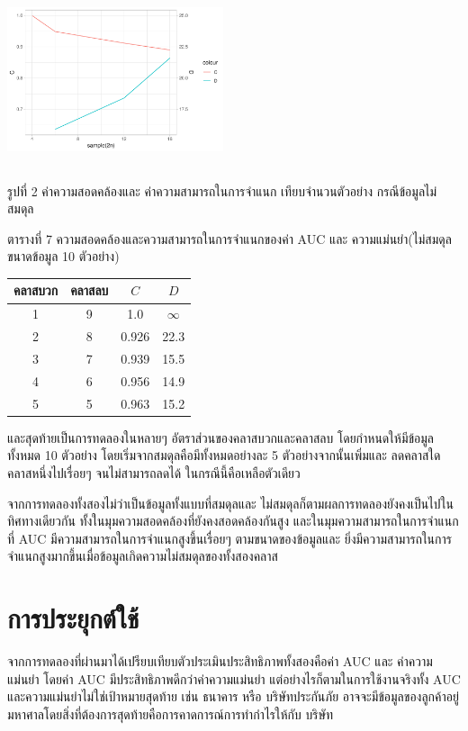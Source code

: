 \documentclass[twoside, twocolumn, 12pt]{article}
\begin{document}
\includegraphics[height=2in,width=2.5in]{pic/Rplot02.pdf}
\begin{center} รูปที่ 2 ค่าความสอดคล้องและ ค่าความสามารถในการจำแนก เทียบจำนวนตัวอย่าง กรณีข้อมูลไม่สมดุล\end{center}
ตารางที่ 7 ความสอดคล้องและความสามารถในการจำแนกของค่า AUC และ ความแม่นยำ(ไม่สมดุล ขนาดข้อมูล 10 ตัวอย่าง)
\begin{center}
\begin{tabular}{cccc}
\hline
คลาสบวก & คลาสลบ & $C$ & $D$\\
\hline
1&9&1.0 &$\infty$\\\hline
2&8&0.926&22.3\\\hline
3&7&0.939&15.5\\\hline
4&6&0.956&14.9\\\hline
5&5&0.963&15.2\\\hline
\end{tabular}
\end{center}

และสุดท้ายเป็นการทดลองในหลายๆ อัตราส่วนของคลาสบวกและคลาสลบ โดยกำหนดให้มีข้อมูลทั้งหมด 10 ตัวอย่าง โดยเริ่มจากสมดุลคือมีทั้งหมดอย่างละ 5 ตัวอย่างจากนั้นเพิ่มและ ลดคลาสใดคลาสหนึ่งไปเรื่อยๆ จนไม่สามารถลดได้ ในกรณีนี้คือเหลือตัวเดียว

จากการทดลองทั้งสองไม่ว่าเป็นข้อมูลทั้งแบบที่สมดุลและ ไม่สมดุลก็ตามผลการทดลองยังคงเป็นไปในทิศทางเดียวกัน ทั้งในมุมความสอดคล้องที่ยังคงสอดคล้องกันสูง และในมุมความสามารถในการจำแนกที่ AUC มีความสามารถในการจำแนกสูงขึ้นเรื่อยๆ ตามขนาดของข้อมูลและ ยิ่งมีความสามารถในการจำแนกสูงมากขึ้นเมื่อข้อมูลเกิดความไม่สมดุลของทั้งสองคลาส


\section{การประยุกต์ใช้}
\quad จากการทดลองที่ผ่านมาได้เปรียบเทียบตัวประเมินประสิทธิภาพทั้งสองคือค่า AUC และ ค่าความแม่นยำ โดยค่า AUC มีประสิทธิภาพดีกว่าค่าความแม่นยำ แต่อย่างไรก็ตามในการใช้งานจริงทั้ง AUC และความแม่นยำไม่ใช่เป้าหมายสุดท้าย เช่น  ธนาคาร หรือ บริษัทประกันภัย อาจจะมีข้อมูลของลูกค้าอยู่มหาศาลโดยสิ่งที่ต้องการสุดท้ายคือการคาดการณ์การทำกำไรให้กับ บริษัท
\end{document}
